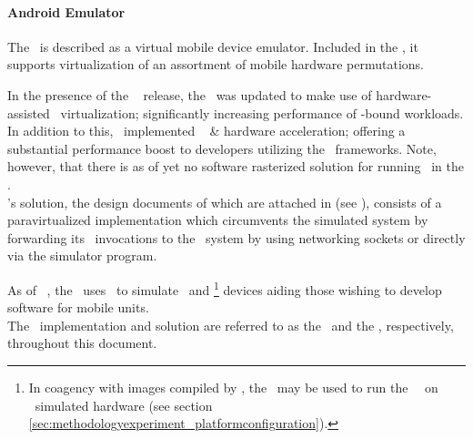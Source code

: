 \paragraph{Android Emulator}
\label{par:relatedwork_qemu_androidemulator}
The \dvttermandroidemulator\ is described as a virtual mobile device emulator.
Included in the \dvttermandroidsdk , it supports virtualization of an assortment of mobile hardware permutations.

In the presence of the \dvttermandroid\  release, the \dvttermandroidsdk\ was updated to make use of hardware-assisted \dvttermxeightysix\ virtualization; significantly increasing performance of \dvttermcpu -bound workloads.
In addition to this, \dvttermgoogle\ implemented \dvttermopengles\  \&  hardware acceleration; offering a substantial performance boost to developers utilizing the \dvttermopengles\ frameworks.
Note, however, that there is as of yet no software rasterized solution for running \dvttermopenglestwopointo\ in the \dvttermandroidemulator .\\

\noindent
\dvttermgoogle 's solution, the design documents of which are attached in  (see ), consists of a paravirtualized implementation which circumvents the simulated system by forwarding its \dvttermopengles\ invocations to the \dvttermhost\ system by using networking sockets or directly via the simulator program.

As of \dvttermandroid\ , the \dvttermandroidemulator\ uses \dvttermqemu\ to simulate \dvttermarm\ and \dvttermxeightysix \footnote{In coagency with images compiled by \dvttermintel , the \dvttermandroidemulator\ may be used to run the \dvttermandroid\ \dvttermos\ on \dvttermxeightysix\ simulated hardware (see section \ref{sec:methodologyexperiment_platformconfiguration}).} devices aiding those wishing to develop software for mobile units.\\

\noindent
The \dvttermandroidemulator\ implementation and solution are referred to as the \dvttermreferenceimplementation\ and the \dvttermreferencesolution , respectively, throughout this document.
